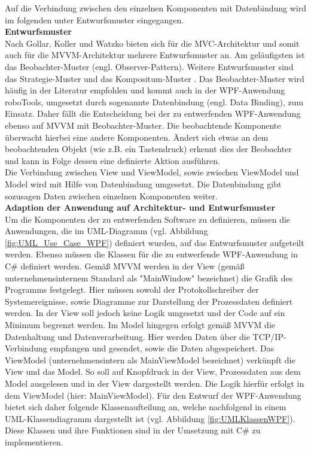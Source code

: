 \documentclass[ a4paper,
                oneside,
                toc=bibliography,
                toc=listof
                ]{scrbook}
\begin{document}
	Auf die Verbindung zwischen den einzelnen Komponenten mit Datenbindung wird im folgenden unter Entwurfsmuster eingegangen.\vspace{0.5\baselineskip}\\
	\textbf{Entwurfsmuster}\\
	Nach Gollar, Koller und Watzko \cite{ArchitekturmusterGoll} bieten sich für die MVC-Architektur und somit auch für die MVVM-Architektur mehrere Entwurfsmuster an. Am geläufigsten ist das Beobachter-Muster (engl. Observer-Pattern). Weitere Entwurfsmuster sind das Strategie-Muster und das Kompositum-Muster \cite{ArchitekturmusterGoll}. Das Beobachter-Muster wird häufig in der Literatur empfohlen und kommt auch in der WPF-Anwendung roboTools, umgesetzt durch sogenannte Datenbindung (engl. Data Binding), zum Einsatz. Daher fällt die Entscheidung bei der zu entwerfenden WPF-Anwendung ebenso auf MVVM mit Beobachter-Muster. Die beobachtende Komponente überwacht hierbei eine andere Komponenten. Ändert sich etwas an dem beobachtenden Objekt (wie z.B. ein Tastendruck) erkennt dies der Beobachter und kann in Folge dessen eine definierte Aktion ausführen. \cite{ArchitekturmusterGoll}\\
	Die Verbindung zwischen View und ViewModel, sowie zwischen ViewModel und Model wird mit Hilfe von Datenbindung umgesetzt. Die Datenbindung gibt sozusagen Daten zwischen einzelnen Komponenten weiter.\vspace{0.5\baselineskip}\\
	\textbf{Adaption der Anwendung auf Architektur- und Entwurfsmuster}\\
	Um die Komponenten der zu entwerfenden Software zu definieren, müssen die Anwendungen, die im UML-Diagramm (vgl. Abbildung \ref{fig:UML_Use_Case_WPF}) definiert wurden, auf das Entwurfsmuster aufgeteilt werden. Ebenso müssen die Klassen für die zu entwerfende WPF-Anwendung in C\# definiert werden. Gemäß MVVM werden in der View (gemäß unternehmensinternem Standard als "MainWindow" bezeichnet)
	die Grafik des Programms festgelegt. Hier müssen sowohl der Protokollschreiber der Systemereignisse, sowie Diagramme zur Darstellung der Prozessdaten definiert werden. In der View soll jedoch keine Logik umgesetzt und der Code auf ein Minimum begrenzt werden. Im Model hingegen erfolgt gemäß MVVM die Datenhaltung und Datenverarbeitung. Hier werden Daten über die TCP/IP-Verbindung empfangen und gesendet, sowie die Daten abgespeichert. Das ViewModel (unternehmensintern als MainViewModel bezeichnet) verkünpft die View und das Model. So soll auf Knopfdruck in der View, Prozessdaten aus dem Model ausgelesen und in der View dargestellt werden. Die Logik hierfür erfolgt in dem ViewModel (hier: MainViewModel). Für den Entwurf der WPF-Anwendung bietet sich daher folgende Klassenaufteilung an, welche nachfolgend in einem UML-Klassendiagramm dargestellt ist (vgl. Abbildung \ref{fig:UMLKlassenWPF}). Diese Klassen und ihre Funktionen sind in der Umsetzung mit C\# zu implementieren.
\end{document}
